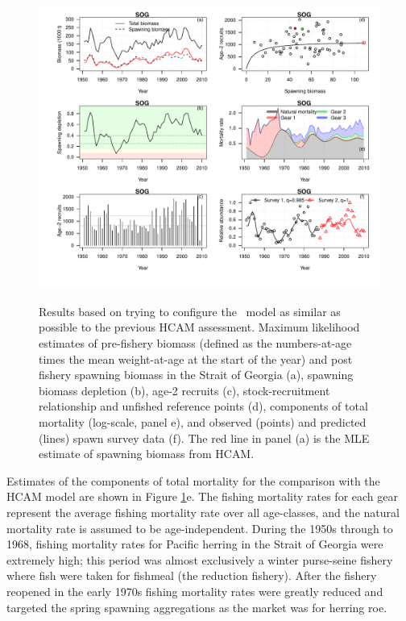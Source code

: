 \begin{figure}[!tbp]
	\includegraphics[width=\textwidth]{../Figs/iscam_fig_HCAM_SOG_MLE.pdf}\\
	\caption{Results  based on trying to configure the \iscam\ model as similar as possible to the previous HCAM assessment.  Maximum likelihood estimates of pre-fishery biomass (defined as the numbers-at-age times the mean weight-at-age at the start of the year) and post fishery spawning biomass in the Strait of Georgia (a), spawning biomass depletion (b), age-2 recruits (c), stock-recruitment relationship and unfished reference points (d), components of total mortality (log-scale, panel e), and observed (points) and predicted (lines) spawn survey data (f).  The red line in panel (a) is the MLE estimate of spawning biomass from HCAM.}\label{fig1_HCAM_ctrl}
\end{figure}


Estimates of the components of total mortality for the comparison with the HCAM model are shown in Figure \ref{fig1_HCAM_ctrl}e.  The fishing mortality rates for each gear represent the average fishing mortality rate over all age-classes, and the natural mortality rate is assumed to be age-independent.  During the 1950s through to 1968, fishing mortality rates for Pacific herring in the Strait of Georgia were extremely high; this period was almost exclusively a winter purse-seine fishery where fish were taken for fishmeal (the reduction fishery).  After the fishery reopened in the early 1970s fishing mortality rates were greatly reduced and targeted the spring spawning aggregations as the market was for herring roe. 

